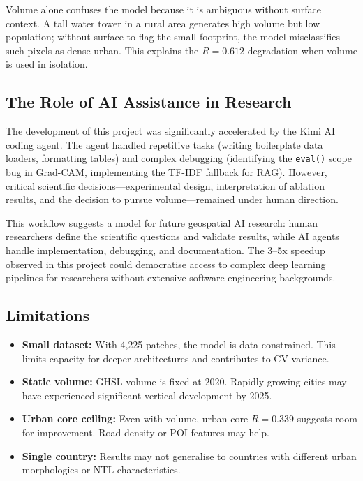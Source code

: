 \documentclass[12pt,a4paper]{article}
\begin{document}
Volume alone confuses the model because it is ambiguous without surface context. A tall water tower in a rural area generates high volume but low population; without surface to flag the small footprint, the model misclassifies such pixels as dense urban. This explains the $R = 0.612$ degradation when volume is used in isolation.

\subsection{The Role of AI Assistance in Research}
\label{subsec:ai_discussion}

The development of this project was significantly accelerated by the Kimi AI coding agent. The agent handled repetitive tasks (writing boilerplate data loaders, formatting tables) and complex debugging (identifying the \texttt{eval()} scope bug in Grad-CAM, implementing the TF-IDF fallback for RAG). However, critical scientific decisions---experimental design, interpretation of ablation results, and the decision to pursue volume---remained under human direction.

This workflow suggests a model for future geospatial AI research: human researchers define the scientific questions and validate results, while AI agents handle implementation, debugging, and documentation. The 3--5x speedup observed in this project could democratise access to complex deep learning pipelines for researchers without extensive software engineering backgrounds.

\subsection{Limitations}
\label{subsec:limitations}

\begin{itemize}
    \item \textbf{Small dataset:} With 4,225 patches, the model is data-constrained. This limits capacity for deeper architectures and contributes to CV variance.
    \item \textbf{Static volume:} GHSL volume is fixed at 2020. Rapidly growing cities may have experienced significant vertical development by 2025.
    \item \textbf{Urban core ceiling:} Even with volume, urban-core $R = 0.339$ suggests room for improvement. Road density or POI features may help.
    \item \textbf{Single country:} Results may not generalise to countries with different urban morphologies or NTL characteristics.
\end{itemize}
\end{document}
